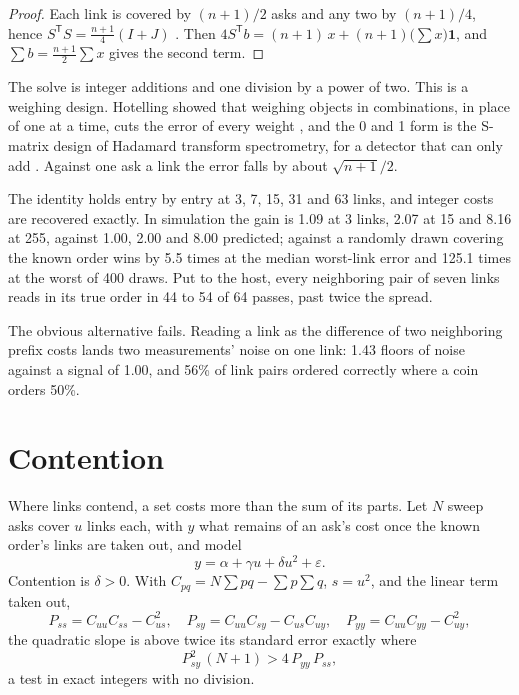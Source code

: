 \begin{proof}
Each link is covered by \((n+1)/2\) asks and any two by \((n+1)/4\), hence
\(S^{\mathsf T}S = \tfrac{n+1}{4}(I + J)\) \cite{src:Sloane-Harwit}. Then
\(4S^{\mathsf T}b = (n+1)\,x + (n+1)\bigl(\sum x\bigr)\mathbf 1\), and
\(\sum b = \tfrac{n+1}{2}\sum x\) gives the second term.
\end{proof}

The solve is integer additions and one division by a power of two. This is a weighing design.
Hotelling showed that weighing objects in combinations, in place of one at a time, cuts the
error of every weight \cite{src:Hotelling}, and the 0 and 1 form is the S-matrix design of
Hadamard transform spectrometry, for a detector that can only add \cite{src:Sloane-Harwit}.
Against one ask a link the error falls by about \(\sqrt{n+1}/2\).

The identity holds entry by entry at 3, 7, 15, 31 and 63 links, and integer costs are recovered
exactly. In simulation the gain is 1.09 at 3 links, 2.07 at 15 and 8.16 at 255, against 1.00,
2.00 and 8.00 predicted; against a randomly drawn covering the known order wins by 5.5 times at
the median worst-link error and 125.1 times at the worst of 400 draws. Put to the host, every
neighboring pair of seven links reads in its true order in 44 to 54 of 64 passes, past twice the
spread.

The obvious alternative fails. Reading a link as the difference of two neighboring prefix costs
lands two measurements' noise on one link: 1.43 floors of noise against a signal of 1.00, and
56\% of link pairs ordered correctly where a coin orders 50\%.

\section{Contention}

Where links contend, a set costs more than the sum of its parts. Let \(N\) sweep asks cover
\(u\) links each, with \(y\) what remains of an ask's cost once the known order's links are taken
out, and model
\[
  y = \alpha + \gamma u + \delta u^2 + \varepsilon .
\]
Contention is \(\delta > 0\). With \(C_{pq} = N\sum pq - \sum p \sum q\), \(s = u^2\), and the
linear term taken out,
\[
  P_{ss} = C_{uu}C_{ss} - C_{us}^2, \quad P_{sy} = C_{uu}C_{sy} - C_{us}C_{uy}, \quad
  P_{yy} = C_{uu}C_{yy} - C_{uy}^2,
\]
the quadratic slope is above twice its standard error exactly where
\[
  P_{sy}^2\,(N+1) > 4\,P_{yy}\,P_{ss},
\]
a test in exact integers with no division.

